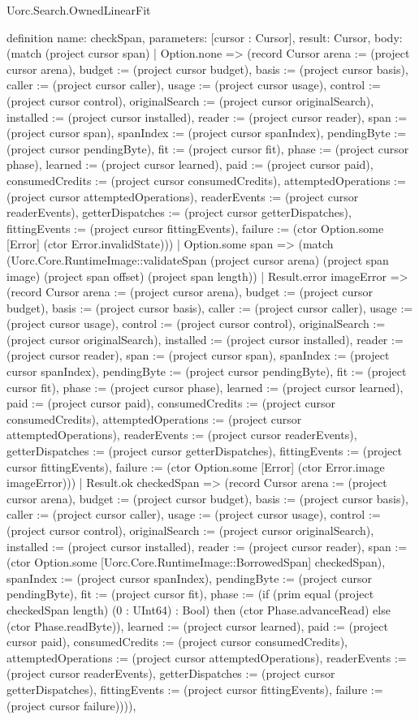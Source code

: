 \begin{lexlean}{Uorc.Search.OwnedLinearFit}
\begin{semanticmodule}
definition{
  name: checkSpan,
  parameters: [cursor : Cursor],
  result: Cursor,
  body: (match (project cursor span)
    | Option.none => (record Cursor {arena := (project cursor arena), budget := (project cursor budget), basis := (project cursor basis), caller := (project cursor caller), usage := (project cursor usage), control := (project cursor control), originalSearch := (project cursor originalSearch), installed := (project cursor installed), reader := (project cursor reader), span := (project cursor span), spanIndex := (project cursor spanIndex), pendingByte := (project cursor pendingByte), fit := (project cursor fit), phase := (project cursor phase), learned := (project cursor learned), paid := (project cursor paid), consumedCredits := (project cursor consumedCredits), attemptedOperations := (project cursor attemptedOperations), readerEvents := (project cursor readerEvents), getterDispatches := (project cursor getterDispatches), fittingEvents := (project cursor fittingEvents), failure := (ctor Option.some [Error] (ctor Error.invalidState))})
    | Option.some span => (match (Uorc.Core.RuntimeImage::validateSpan (project cursor arena) (project span image) (project span offset) (project span length))
      | Result.error imageError => (record Cursor {arena := (project cursor arena), budget := (project cursor budget), basis := (project cursor basis), caller := (project cursor caller), usage := (project cursor usage), control := (project cursor control), originalSearch := (project cursor originalSearch), installed := (project cursor installed), reader := (project cursor reader), span := (project cursor span), spanIndex := (project cursor spanIndex), pendingByte := (project cursor pendingByte), fit := (project cursor fit), phase := (project cursor phase), learned := (project cursor learned), paid := (project cursor paid), consumedCredits := (project cursor consumedCredits), attemptedOperations := (project cursor attemptedOperations), readerEvents := (project cursor readerEvents), getterDispatches := (project cursor getterDispatches), fittingEvents := (project cursor fittingEvents), failure := (ctor Option.some [Error] (ctor Error.image imageError))})
      | Result.ok checkedSpan => (record Cursor {arena := (project cursor arena), budget := (project cursor budget), basis := (project cursor basis), caller := (project cursor caller), usage := (project cursor usage), control := (project cursor control), originalSearch := (project cursor originalSearch), installed := (project cursor installed), reader := (project cursor reader), span := (ctor Option.some [Uorc.Core.RuntimeImage::BorrowedSpan] checkedSpan), spanIndex := (project cursor spanIndex), pendingByte := (project cursor pendingByte), fit := (project cursor fit), phase := (if (prim equal (project checkedSpan length) (0 : UInt64) : Bool) then (ctor Phase.advanceRead) else (ctor Phase.readByte)), learned := (project cursor learned), paid := (project cursor paid), consumedCredits := (project cursor consumedCredits), attemptedOperations := (project cursor attemptedOperations), readerEvents := (project cursor readerEvents), getterDispatches := (project cursor getterDispatches), fittingEvents := (project cursor fittingEvents), failure := (project cursor failure)}))),
}
\end{semanticmodule}
\end{lexlean}
